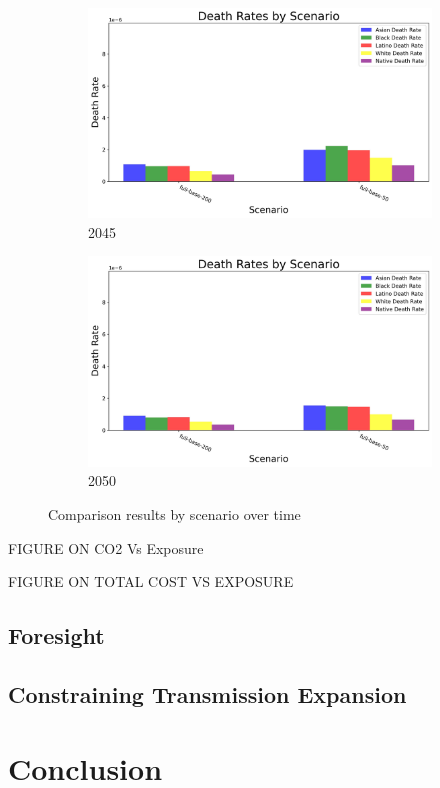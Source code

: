 \documentclass[a4paper]{article}
\theoremstyle{definition}
\theoremstyle{plain}
\begin{document}
\begin{figure}
    \begin{subfigure}[b]{0.45\textwidth}
        \includegraphics[width=\textwidth]{Figures/Output/ISRM_deathrate_by_scenario_2045.jpg}
        \caption{2045}
        \label{Subfig2}
    \end{subfigure}
    \hfill
    \begin{subfigure}[b]{0.45\textwidth}
        \includegraphics[width=\textwidth]{Figures/Output/ISRM_deathrate_by_scenario_2050.jpg}
        \caption{2050}
        \label{Subfig2}
    \end{subfigure}
    \caption{Comparison results by scenario over time}
    \label{Compare Scenarios}
\end{figure}

FIGURE ON CO2 Vs Exposure

FIGURE ON TOTAL COST VS EXPOSURE
\subsection{Foresight}

\subsection{Constraining Transmission Expansion}

\section{Conclusion}

\begin{singlespace}
\newpage

%

\end{singlespace}
\end{document}

